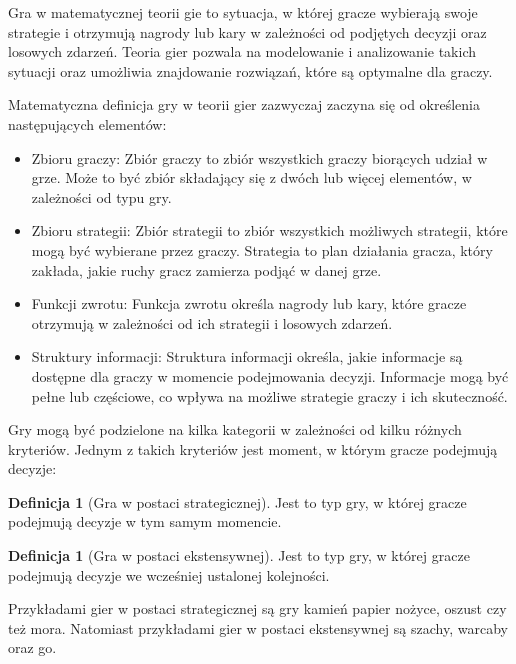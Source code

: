 \documentclass[inzynierska]{pwr_wmat_praca_dyplomowa}
\theoremstyle{plain}
\numberwithin{theorem}{chapter}
\theoremstyle{definition}
\numberwithin{theorem}{chapter}
\newtheorem{definition}[theorem]{Definicja}
\begin{document}
Gra w matematycznej teorii gie to sytuacja, w której gracze wybierają swoje strategie i otrzymują nagrody lub kary w zależności od podjętych decyzji  oraz losowych zdarzeń. Teoria gier pozwala na modelowanie i analizowanie takich sytuacji oraz umożliwia znajdowanie rozwiązań, które są optymalne dla graczy.

Matematyczna definicja gry w teorii gier zazwyczaj zaczyna się od określenia następujących elementów:

\begin{itemize}
	\item Zbioru graczy: Zbiór graczy to zbiór wszystkich graczy biorących udział w grze. Może to być zbiór składający się z dwóch lub więcej elementów, w zależności od typu gry.
	
	\item Zbioru strategii: Zbiór strategii to zbiór wszystkich możliwych strategii, które mogą być wybierane przez graczy. Strategia to plan działania gracza, który zakłada, jakie ruchy gracz zamierza podjąć w danej grze.
	
	\item Funkcji zwrotu: Funkcja zwrotu określa nagrody lub kary, które gracze otrzymują w zależności od ich strategii i losowych zdarzeń.
	
	\item Struktury informacji: Struktura informacji określa, jakie informacje są dostępne dla graczy w momencie podejmowania decyzji. Informacje mogą być pełne lub częściowe, co wpływa na możliwe strategie graczy i ich skuteczność.
\end{itemize}

Gry mogą być podzielone na kilka kategorii w zależności od kilku różnych kryteriów. Jednym z takich kryteriów jest moment, w którym gracze podejmują decyzje:
\begin{definition}[Gra w postaci strategicznej]
Jest to typ gry, w której gracze podejmują decyzje w tym samym
momencie.
\end{definition}
\begin{definition}[Gra w postaci ekstensywnej]
	Jest to typ gry, w której gracze podejmują decyzje we wcześniej
	ustalonej kolejności.
\end{definition}
Przykładami gier w postaci strategicznej są gry kamień papier nożyce, oszust czy też mora. Natomiast przykładami gier w postaci ekstensywnej są szachy, warcaby oraz go.
\end{document}
